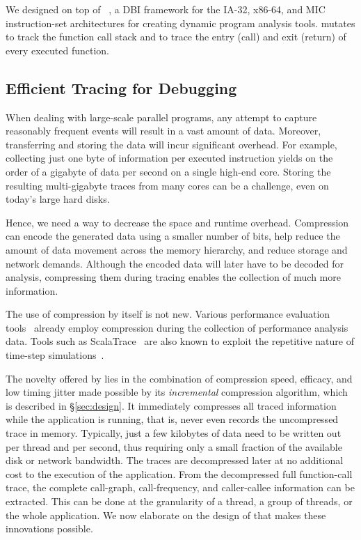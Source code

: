  
%


We designed \parlot on top of \pin~\cite{pin}, a DBI framework for the IA-32, x86-64, and MIC instruction-set architectures for creating dynamic program analysis tools. \parlot mutates \pin to track the function call stack and to trace the entry (call) and exit (return) of every executed function.


\subsection{Efficient Tracing for Debugging}
When dealing with large-scale parallel programs, any attempt to capture reasonably frequent events will result in a vast amount of data. Moreover, transferring and storing the data will incur significant overhead. For example, collecting just one byte of information per executed instruction yields on the order of a gigabyte of data per second on a single high-end core. Storing the resulting multi-gigabyte traces from many cores can be a challenge, even on today's large hard disks.

Hence, we need a way to decrease the space and runtime overhead. Compression can encode the generated data using a smaller number of bits, help
reduce the amount of data movement across the memory hierarchy, and
reduce storage and network demands.
%
Although the encoded data will later have to be decoded for analysis, compressing them during tracing enables the collection of much more information.

The use of compression by itself is not new.
Various performance evaluation tools~\cite{tau,scorep,eventflowgraph} 
already employ compression during the collection
of performance analysis data.
%
Tools such as ScalaTrace~\cite{scalatrace}
are also known to exploit
the repetitive nature of time-step simulations~\cite{freitag}. %


The novelty offered by \parlot lies in the combination of compression
speed, efficacy, and low timing jitter
made possible by its {\em incremental}
compression algorithm, which is
described in \S\ref{sec:design}.
%
It immediately compresses all traced information while the application is running, that is, \parlot never even records the uncompressed trace in memory. 
%
Typically, just a few kilobytes of data need to be written out per thread and per second, thus requiring only a small fraction of the available disk or network bandwidth. 
%
The traces are decompressed later at no additional cost to the execution of the application. 
%
From the decompressed full function-call trace, the complete call-graph, 
call-frequency, and caller-callee information can be extracted. 
%
This can be done at the granularity of a thread, a group of threads, or the whole application.
%
We now elaborate on the design of \parlot that makes
these innovations possible.








